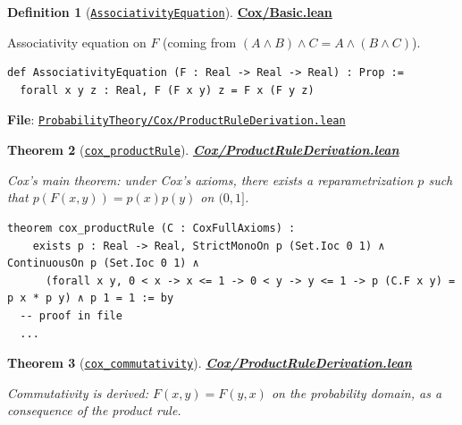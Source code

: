 \documentclass[11pt]{article}
\newtheorem{theorem}{Theorem}[section]
\theoremstyle{definition}
\newtheorem{definition}[theorem]{Definition}
\theoremstyle{remark}
\begin{document}
\begin{definition}[\href{https://github.com/zariuq/ks-foundations-of-inference/blob/main/ProbabilityTheory/Cox/Basic.lean}{\texttt{AssociativityEquation}}]
\textbf{\href{https://github.com/zariuq/ks-foundations-of-inference/blob/main/ProbabilityTheory/Cox/Basic.lean}{Cox/Basic.lean}}

Associativity equation on $F$ (coming from $(A\wedge B)\wedge C = A\wedge(B\wedge C)$).
\end{definition}

\begin{lstlisting}[caption={Associativity functional equation}]
def AssociativityEquation (F : Real -> Real -> Real) : Prop :=
  forall x y z : Real, F (F x y) z = F x (F y z)
\end{lstlisting}

\textbf{File}: \href{https://github.com/zariuq/ks-foundations-of-inference/blob/main/ProbabilityTheory/Cox/ProductRuleDerivation.lean}{\texttt{ProbabilityTheory/Cox/ProductRuleDerivation.lean}}

\begin{theorem}[\href{https://github.com/zariuq/ks-foundations-of-inference/blob/main/ProbabilityTheory/Cox/ProductRuleDerivation.lean}{\texttt{cox\_productRule}}]
\textbf{\href{https://github.com/zariuq/ks-foundations-of-inference/blob/main/ProbabilityTheory/Cox/ProductRuleDerivation.lean}{Cox/ProductRuleDerivation.lean}}

Cox's main theorem: under Cox's axioms, there exists a reparametrization $p$ such that
$p(F(x,y)) = p(x)p(y)$ on $(0,1]$.
\end{theorem}

\begin{lstlisting}[caption={Cox product rule theorem (reparametrized)}]
theorem cox_productRule (C : CoxFullAxioms) :
    exists p : Real -> Real, StrictMonoOn p (Set.Ioc 0 1) ∧ ContinuousOn p (Set.Ioc 0 1) ∧
      (forall x y, 0 < x -> x <= 1 -> 0 < y -> y <= 1 -> p (C.F x y) = p x * p y) ∧ p 1 = 1 := by
  -- proof in file
  ...
\end{lstlisting}

\begin{theorem}[\href{https://github.com/zariuq/ks-foundations-of-inference/blob/main/ProbabilityTheory/Cox/ProductRuleDerivation.lean}{\texttt{cox\_commutativity}}]
\textbf{\href{https://github.com/zariuq/ks-foundations-of-inference/blob/main/ProbabilityTheory/Cox/ProductRuleDerivation.lean}{Cox/ProductRuleDerivation.lean}}

Commutativity is derived: $F(x,y)=F(y,x)$ on the probability domain, as a consequence of the product rule.
\end{theorem}
\end{document}
